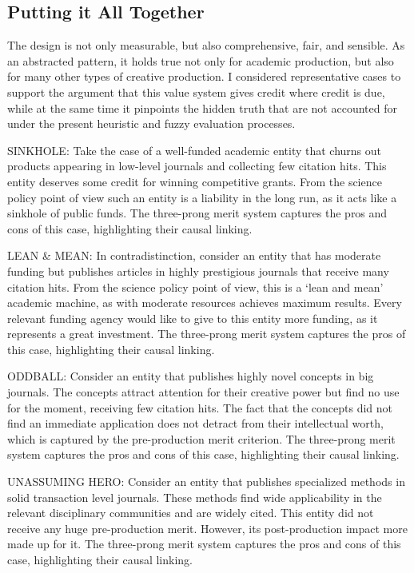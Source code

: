 \subsection* {Putting it All Together}

The design is not only measurable, but also comprehensive, fair, and sensible. As an abstracted pattern, it holds true not only for academic production, but also for many other types of creative production. I considered representative cases to support the argument that this value system gives credit where credit is due, while at the same time it pinpoints the hidden truth that are not accounted for under the present heuristic and fuzzy evaluation processes. 

SINKHOLE: Take the case of a well-funded academic entity that churns out products appearing in low-level journals and collecting few citation hits. This entity deserves some credit for winning competitive grants. From the science policy point of view such an entity is a liability in the long run, as it acts like a sinkhole of public funds. The three-prong merit system captures the pros and cons of this case, highlighting their causal linking.

LEAN \& MEAN: In contradistinction, consider an entity that has moderate funding but publishes articles in highly prestigious journals that receive many citation hits. From the science policy point of view, this is a `lean and mean' academic machine, as with moderate resources achieves maximum results. Every relevant funding agency would like to give to this entity more funding, as it represents a great investment. The three-prong merit system captures the pros of this case, highlighting their causal linking.

ODDBALL: Consider an entity that publishes highly novel concepts in big journals. The concepts attract attention for their creative power but find no use for the moment, receiving few citation hits. The fact that the concepts did not find an immediate application does not detract from their intellectual worth, which is captured by the pre-production merit criterion. The three-prong merit system captures the pros and cons of this case, highlighting their causal linking.

UNASSUMING HERO: Consider an entity that publishes specialized methods in solid transaction level journals. These methods find wide applicability in the relevant disciplinary communities and are widely cited. This entity did not receive any huge pre-production merit. However, its post-production impact more made up for it. The three-prong merit system captures the pros and cons of this case, highlighting their causal linking.


